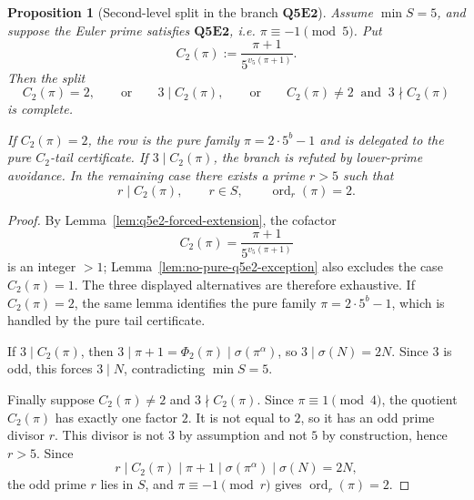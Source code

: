 \documentclass[11pt]{article}
\newtheorem{proposition}[theorem]{Proposition}
\theoremstyle{definition}
\theoremstyle{remark}
\DeclareMathOperator{\ord}{ord}
\begin{document}
\begin{proposition}[Second-level split in the branch \(\mathbf{Q5E2}\)]
\label{prop:q5e2-second-level-split}
Assume \(\min S=5\), and suppose the Euler prime satisfies
\(\mathbf{Q5E2}\), i.e. \(\pi\equiv-1\pmod5\).
Put
\[
  C_2(\pi):=\frac{\pi+1}{5^{v_5(\pi+1)}}.
\]
Then the split
\[
  C_2(\pi)=2,
  \qquad\text{or}\qquad
  3\mid C_2(\pi),
  \qquad\text{or}\qquad
  C_2(\pi)\ne2\ \text{ and }\ 3\nmid C_2(\pi)
\]
is complete.

If \(C_2(\pi)=2\), the row is the pure family
\(\pi=2\cdot5^b-1\) and is delegated to the pure \(C_2\)-tail certificate.  If
\(3\mid C_2(\pi)\), the branch is refuted by lower-prime avoidance.  In the
remaining case there exists a prime \(r>5\) such that
\[
  r\mid C_2(\pi),\qquad r\in S,\qquad \ord_r(\pi)=2.
\]
\end{proposition}

\begin{proof}
By Lemma~\ref{lem:q5e2-forced-extension}, the cofactor
\[
  C_2(\pi)=\frac{\pi+1}{5^{v_5(\pi+1)}}
\]
is an integer \(>1\); Lemma~\ref{lem:no-pure-q5e2-exception} also excludes the
case \(C_2(\pi)=1\).  The three displayed alternatives are therefore
exhaustive.  If \(C_2(\pi)=2\), the same lemma identifies the pure family
\(\pi=2\cdot5^b-1\), which is handled by the pure tail certificate.

If \(3\mid C_2(\pi)\), then
\(3\mid\pi+1=\Phi_2(\pi)\mid\sigma(\pi^\alpha)\), so
\(3\mid\sigma(N)=2N\).  Since \(3\) is odd, this forces \(3\mid N\),
contradicting \(\min S=5\).

Finally suppose \(C_2(\pi)\ne2\) and \(3\nmid C_2(\pi)\).  Since
\(\pi\equiv1\pmod4\), the quotient \(C_2(\pi)\) has exactly one factor \(2\).
It is not equal to \(2\), so it has an odd prime divisor \(r\).  This divisor
is not \(3\) by assumption and not \(5\) by construction, hence \(r>5\).  Since
\[
  r\mid C_2(\pi)\mid \pi+1\mid\sigma(\pi^\alpha)\mid\sigma(N)=2N,
\]
the odd prime \(r\) lies in \(S\), and \(\pi\equiv-1\pmod r\) gives
\(\ord_r(\pi)=2\).
\end{proof}
\end{document}
